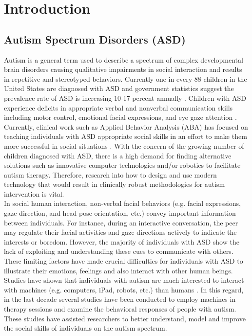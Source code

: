 \chapter{Introduction}

\section{Autism Spectrum Disorders (ASD)}
Autism is a general term used to describe a spectrum of complex developmental
brain disorders causing qualitative impairments in social interaction and results in
repetitive and stereotyped behaviors. Currently one in every 88 children in the United
States are diagnosed with ASD and government statistics suggest the prevalence rate of
ASD is increasing 10-17 percent annually \cite{Fetch2002}. Children with ASD experience deficits in
appropriate verbal and nonverbal communication skills including motor control, emotional
facial expressions, and eye gaze attention \cite{RobotPlaymate2002}. Currently, clinical work such as Applied
Behavior Analysis (ABA) \cite{RollingRobot2002, MobileRobotic2002} has focused on teaching individuals with ASD
appropriate social skills in an effort to make them more successful in social situations \cite{Behavioral1964}.
With the concern of the growing number of children diagnosed with ASD, there is a high
demand for finding alternative solutions such as innovative computer technologies and/or
robotics to facilitate autism therapy. Therefore, research into how to design and use modern
technology that would result in clinically robust methodologies for autism intervention is
vital.\\

In social human interaction, non-verbal facial behaviors (e.g. facial expressions,
gaze direction, and head pose orientation, etc.) convey important information between
individuals. For instance, during an interactive conversation, the peer may regulate their
facial activities and gaze directions actively to indicate the interests or boredom. However,
the majority of individuals with ASD show the lack of exploiting and understanding these
cues to communicate with others. These limiting factors have made crucial difficulties for
individuals with ASD to illustrate their emotions, feelings and also interact with other
human beings. Studies have shown that individuals with autism are much interested to
interact with machines (e.g. computers, iPad, robots, etc.) than humans \cite{SocialInteract2003}. In this regard,
in the last decade several studies have been conducted to employ machines in therapy
sessions and examine the behavioral responses of people with autism. These studies have
assisted researchers to better understand, model and improve the social skills of individuals
on the autism spectrum.\\

